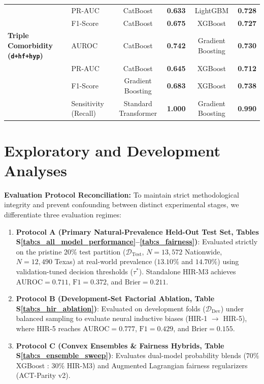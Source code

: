 \documentclass[10pt,journal]{IEEEtran}
\begin{document}
\begin{table}[!t]
\begin{tabular}{llcccc}
 & PR-AUC & CatBoost & \textbf{0.633} & LightGBM & \textbf{0.728} \\
 & F1-Score & CatBoost & \textbf{0.675} & XGBoost & \textbf{0.727} \\
\midrule
\textbf{Triple Comorbidity (\texttt{d+hf+hyp})} & AUROC & CatBoost & \textbf{0.742} & Gradient Boosting & \textbf{0.730} \\
 & PR-AUC & CatBoost & \textbf{0.645} & XGBoost & \textbf{0.712} \\
 & F1-Score & Gradient Boosting & \textbf{0.683} & XGBoost & \textbf{0.738} \\
 & Sensitivity (Recall) & Standard Transformer & \textbf{1.000} & Gradient Boosting & \textbf{0.990} \\
\bottomrule
\end{tabular}
\end{table}

\section{Exploratory and Development Analyses}

\noindent\textbf{Evaluation Protocol Reconciliation:} 
To maintain strict methodological integrity and prevent confounding between distinct experimental stages, we differentiate three evaluation regimes:
\begin{enumerate}
    \item \textbf{Protocol A (Primary Natural-Prevalence Held-Out Test Set, Tables S\ref{tab:s_all_model_performance}--\ref{tab:s_fairness})}: Evaluated strictly on the pristine 20\% test partition ($\mathcal{D}_{\text{Test}}$, $N=13{,}572$ Nationwide, $N=12{,}490$ Texas) at real-world prevalence ($13.10\%$ and $14.70\%$) using validation-tuned decision thresholds ($\tau^*$). Standalone HIR-M3 achieves $\text{AUROC} = 0.711$, $\text{F1} = 0.372$, and $\text{Brier} = 0.211$.
    \item \textbf{Protocol B (Development-Set Factorial Ablation, Table S\ref{tab:s_hir_ablation})}: Evaluated on development folds ($\mathcal{D}_{\text{Dev}}$) under balanced sampling to evaluate neural inductive biases (HIR-1 $\to$ HIR-5), where HIR-5 reaches $\text{AUROC} = 0.777$, $\text{F1} = 0.429$, and $\text{Brier} = 0.155$.
    \item \textbf{Protocol C (Convex Ensembles \& Fairness Hybrids, Table S\ref{tab:s_ensemble_sweep})}: Evaluates dual-model probability blends ($70\%$ XGBoost : $30\%$ HIR-M3) and Augmented Lagrangian fairness regularizers (ACT-Parity v2).
\end{enumerate}
\end{document}
